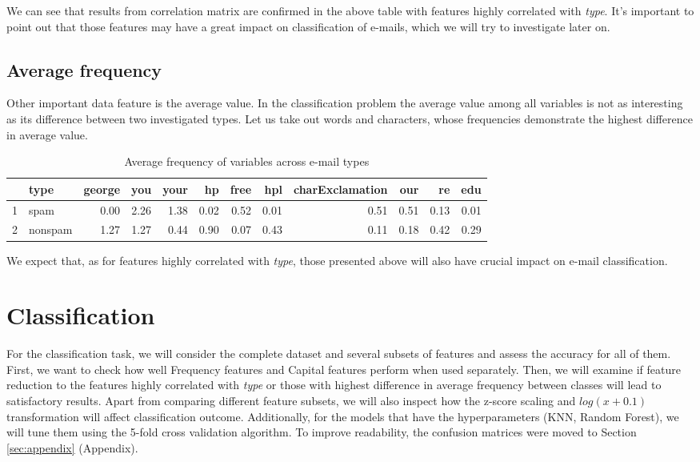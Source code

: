 \documentclass{article}\usepackage[]{graphicx}\usepackage[]{xcolor}
\begin{document}
We can see that results from correlation matrix are confirmed in the above table with features highly correlated with \textit{type}. It's important to point 
out that those features may have a great impact on classification of e-mails,
which we will try to investigate later on.
	
\subsection*{Average frequency}
	
Other important data feature is the average value. In the classification problem 
the average value among all variables is not as interesting as its difference between 
two investigated types. Let us take out words and characters, whose frequencies 
demonstrate the highest difference in average value.

\begin{table}[ht]
\centering
\begin{tabular}{rlrrrrrrrrrr}
  \hline
 & type & george & you & your & hp & free & hpl & charExclamation & our & re & edu \\ 
  \hline
1 & spam & 0.00 & 2.26 & 1.38 & 0.02 & 0.52 & 0.01 & 0.51 & 0.51 & 0.13 & 0.01 \\ 
  2 & nonspam & 1.27 & 1.27 & 0.44 & 0.90 & 0.07 & 0.43 & 0.11 & 0.18 & 0.42 & 0.29 \\ 
   \hline
\end{tabular}
\caption{Average frequency of variables across e-mail types} 
\label{tab3}
\end{table}


We expect that, as for features highly correlated with \textit{type}, those presented 
above will also have crucial impact on e-mail classification.

\clearpage

\section{Classification}

For the classification task, we will consider the complete dataset and several 
subsets of features and assess the accuracy for all of them. First, we want to check
how well Frequency features and Capital features perform when used separately. 
Then, we will examine if feature reduction to the features highly correlated with \textit{type}
or those with highest difference in average frequency between classes will lead 
to satisfactory results. Apart from comparing different feature subsets, we will also
inspect how the z-score scaling and $log(x+0.1)$ transformation will affect classification
outcome. Additionally, for the models that have the hyperparameters (KNN, Random Forest), we will tune them
using the 5-fold cross validation algorithm. To improve readability, the confusion matrices were moved to Section \ref{sec:appendix} (Appendix).
\end{document}

